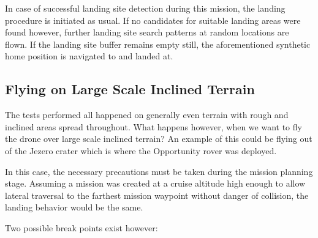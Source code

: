 In case of successful landing site detection during this mission, the landing procedure is initiated as usual. If no candidates for suitable landing areas were found however, further landing site search patterns at random locations are flown. If the landing site buffer remains empty still, the aforementioned synthetic home position is navigated to and landed at.

\subsection{Flying on Large Scale Inclined Terrain}
The tests performed all happened on generally even terrain with rough and inclined areas spread throughout. What happens however, when we want to fly the drone over large scale inclined terrain? An example of this could be flying out of the Jezero crater which is where the Opportunity rover was deployed.

In this case, the necessary precautions must be taken during the mission planning stage. Assuming a mission was created at a cruise altitude high enough to allow lateral traversal to the farthest mission waypoint without danger of collision, the landing behavior would be the same. 

Two possible break points exist however:

